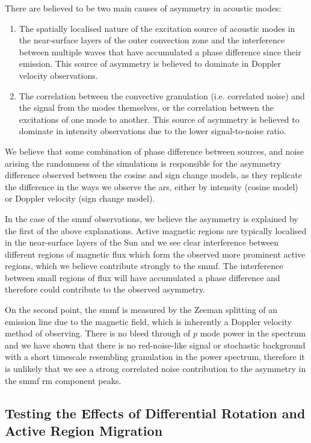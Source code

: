 There are believed to be two main causes of asymmetry in acoustic modes:

\begin{enumerate}
	\item{The spatially localised nature of the excitation source of acoustic modes in the near-surface layers of the outer convection zone and the interference between multiple waves that have accumulated a phase difference since their emission. This source of asymmetry is believed to dominate in Doppler velocity observations.}
	
	\item{The correlation between the convective granulation (i.e. correlated noise) and the signal from the modes themselves, or the correlation between the excitations of one mode to another. This source of asymmetry is believed to dominate in intensity observations due to the lower signal-to-noise ratio.}
\end{enumerate}

We believe that some combination of phase difference between sources, and noise arising the randomness of the simulations is responsible for the asymmetry difference observed between the cosine and sign change models, as they replicate the difference in the ways we observe the \glspl{ar}, either by intensity (cosine model) or Doppler velocity (sign change model).

In the case of the \gls{smmf} observations, we believe the asymmetry is explained by the first of the above explanations. Active magnetic regions are typically localised in the near-surface layers of the Sun and we see clear interference between different regions of magnetic flux which form the observed more prominent active regions, which we believe contribute strongly to the \gls{smmf}. The interference between small regions of flux will have accumulated a phase difference and therefore could contribute to the observed asymmetry.

On the second point, the \gls{smmf} is measured by the Zeeman splitting of an emission line due to the magnetic field, which is inherently a Doppler velocity method of observing. There is no bleed through of $p$ mode power in the spectrum and we have shown that there is no red-noise-like signal or stochastic background with a short timescale resembling granulation in the power spectrum, therefore it is unlikely that we see a strong correlated noise contribution to the asymmetry in the \gls{smmf} \gls{rm} component peaks.

 
\subsection{Testing the Effects of Differential Rotation and Active Region Migration}
\label{sec:smearing}

